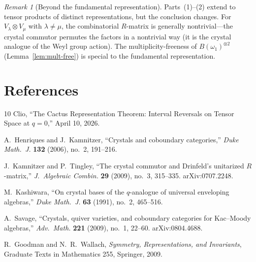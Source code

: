 \documentclass[11pt]{article}
\theoremstyle{remark}
\newtheorem{remark}[theorem]{Remark}
\begin{document}
\begin{remark}[Beyond the fundamental representation]
Parts~(1)--(2) extend to tensor products of distinct representations,
but the conclusion changes. For $V_\lambda \otimes V_\mu$ with $\lambda
\neq \mu$, the combinatorial $R$-matrix is generally nontrivial---the
crystal commutor permutes the factors in a nontrivial way (it is the
crystal analogue of the Weyl group action). The multiplicity-freeness
of $B(\omega_1)^{\otimes 2}$ (Lemma~\ref{lem:mult-free}) is special to
the fundamental representation.
\end{remark}

\section*{References}

\begin{thebibliography}{10}
  Clio,
  ``The Cactus Representation Theorem: Interval Reversals on Tensor Space
  at $q=0$,'' April 10, 2026.

  A.~Henriques and J.~Kamnitzer,
  ``Crystals and coboundary categories,''
  \emph{Duke Math.~J.} \textbf{132} (2006), no.~2, 191--216.

  J.~Kamnitzer and P.~Tingley,
  ``The crystal commutor and Drinfeld's unitarized $R$-matrix,''
  \emph{J.~Algebraic Combin.} \textbf{29} (2009), no.~3, 315--335.
  arXiv:0707.2248.

  M.~Kashiwara,
  ``On crystal bases of the $q$-analogue of universal enveloping algebras,''
  \emph{Duke Math.~J.} \textbf{63} (1991), no.~2, 465--516.

  A.~Savage,
  ``Crystals, quiver varieties, and coboundary categories for Kac--Moody
  algebras,''
  \emph{Adv.~Math.} \textbf{221} (2009), no.~1, 22--60.
  arXiv:0804.4688.

  R.~Goodman and N.~R.~Wallach,
  \emph{Symmetry, Representations, and Invariants},
  Graduate Texts in Mathematics 255, Springer, 2009.
\end{thebibliography}
\end{document}
